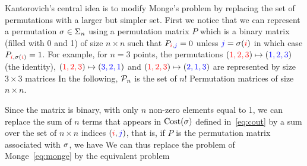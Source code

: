 Kantorovich's central idea is to modify Monge's problem by replacing the set of permutations with a larger but simpler set. First we notice that we can represent a permutation $\sigma \in \Sigma_n$ using a permutation matrix $P$ which is a binary matrix (filled with 0 and 1) of size $n \times n$ such that $P_{{\color{red}i}, {\color{blue}j}} = 0$ unless ${\color{blue}j} = \sigma ({\color{red}i})$ in which case $P_{{\color{red}i}, \sigma ({\color{red}i})} = 1$. For example, for $n = 3$ points, the permutations
$({\color{red}1,2,3}) \mapsto ({\color{blue}1,2,3})$ (the identity),
$({\color{red}1,2,3}) \mapsto ({\color{blue}3,2,1})$ and
$({\color{red}1,2,3}) \mapsto ({\color{blue}2,1,3})$ are represented by size $3 \times 3$ matrices
In the following, $\mathcal{P}_n$ is the set of $n!$ Permutation matrices of size $n \times n$.

Since the matrix is binary, with only $n$ non-zero elements equal to 1, we can replace the sum of $n$ terms that appears in $\text{Cost}(\sigma)$ defined in~\eqref{eq:cout} by a sum over the set of $n \times n$ indices $({\color{red}i}, {\color{blue}j})$, that is, if $P$ is the permutation matrix associated with $\sigma$, we have
We can thus replace the problem of Monge~\eqref{eq:monge} by the equivalent problem

